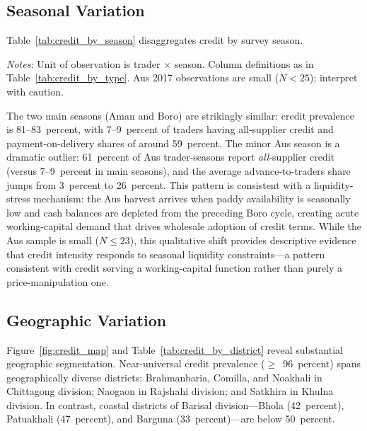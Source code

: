 \documentclass[authoryear,preprint,review,12pt]{elsarticle}
\begin{document}
\subsection{Seasonal Variation}

Table~\ref{tab:credit_by_season} disaggregates credit by survey season.

\begin{table}[htbp]
  \centering
  \caption{Credit Arrangement Types by Season (Paddy)}
  \label{tab:credit_by_season}
  \begin{singlespace}
  \begin{threeparttable}
    
    \begin{tablenotes}\footnotesize
      \item \textit{Notes:} Unit of observation is trader $\times$ season.
      Column definitions as in Table~\ref{tab:credit_by_type}.
      Aus 2017 observations are small ($N < 25$); interpret with caution.
    \end{tablenotes}
  \end{threeparttable}
  \end{singlespace}
\end{table}

The two main seasons (Aman and Boro) are strikingly similar: credit
prevalence is 81--83~percent, with 7--9~percent of traders having
all-supplier credit and payment-on-delivery shares of around 59~percent.
The minor Aus season is a dramatic outlier: 61~percent of Aus trader-seasons
report \textit{all}-supplier credit (versus 7--9~percent in main seasons),
and the average advance-to-traders share jumps from 3~percent to 26~percent.
This pattern is consistent with a liquidity-stress mechanism: the Aus harvest
arrives when paddy availability is seasonally low and cash balances are
depleted from the preceding Boro cycle, creating acute working-capital
demand that drives wholesale adoption of credit terms. While the Aus sample
is small ($N \leq 23$), this qualitative shift provides descriptive evidence
that credit intensity responds to seasonal liquidity constraints---a pattern
consistent with credit serving a working-capital function rather than purely
a price-manipulation one.

\subsection{Geographic Variation}

Figure~\ref{fig:credit_map} and Table~\ref{tab:credit_by_district} reveal
substantial geographic segmentation. Near-universal credit prevalence
($\geq$~96~percent) spans geographically diverse districts: Brahmanbaria,
Comilla, and Noakhali in Chittagong division; Naogaon in Rajshahi division;
and Satkhira in Khulna division. In contrast, coastal districts of
Barisal division---Bhola (42~percent), Patuakhali (47~percent), and
Barguna (33~percent)---are below 50~percent.
\end{document}
